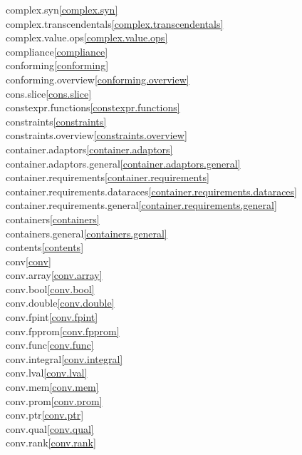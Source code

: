 \begin{multicols}{2}
complex.syn\quad\ref{complex.syn}\\
complex.transcendentals\quad\ref{complex.transcendentals}\\
complex.value.ops\quad\ref{complex.value.ops}\\
compliance\quad\ref{compliance}\\
conforming\quad\ref{conforming}\\
conforming.overview\quad\ref{conforming.overview}\\
cons.slice\quad\ref{cons.slice}\\
constexpr.functions\quad\ref{constexpr.functions}\\
constraints\quad\ref{constraints}\\
constraints.overview\quad\ref{constraints.overview}\\
container.adaptors\quad\ref{container.adaptors}\\
container.adaptors.general\quad\ref{container.adaptors.general}\\
container.requirements\quad\ref{container.requirements}\\
container.requirements.dataraces\quad\ref{container.requirements.dataraces}\\
container.requirements.general\quad\ref{container.requirements.general}\\
containers\quad\ref{containers}\\
containers.general\quad\ref{containers.general}\\
contents\quad\ref{contents}\\
conv\quad\ref{conv}\\
conv.array\quad\ref{conv.array}\\
conv.bool\quad\ref{conv.bool}\\
conv.double\quad\ref{conv.double}\\
conv.fpint\quad\ref{conv.fpint}\\
conv.fpprom\quad\ref{conv.fpprom}\\
conv.func\quad\ref{conv.func}\\
conv.integral\quad\ref{conv.integral}\\
conv.lval\quad\ref{conv.lval}\\
conv.mem\quad\ref{conv.mem}\\
conv.prom\quad\ref{conv.prom}\\
conv.ptr\quad\ref{conv.ptr}\\
conv.qual\quad\ref{conv.qual}\\
conv.rank\quad\ref{conv.rank}\\

\end{multicols}
